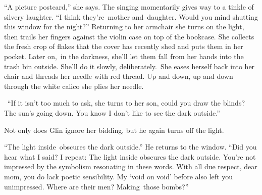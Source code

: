 \documentclass[letterpaper]{article}
\begin{document}
\textcolor[rgb]{0.13333334,0.13333334,0.13333334}{{}``A picture postcard,'' she says. The singing momentarily gives way
to a tinkle of silvery laughter. ``I think they're~mother and~daughter}. Would you mind shutting this window for the
night?\textcolor[rgb]{0.13333334,0.13333334,0.13333334}{{}'' }Returning\textcolor[rgb]{0.0,0.4392157,0.7529412}{
}\textcolor[rgb]{0.13333334,0.13333334,0.13333334}{to her armchair she turns on the light, }then trails her fingers
\textcolor[rgb]{0.13333334,0.13333334,0.13333334}{against the violin case on }top
of\textcolor[rgb]{0.0,0.4392157,0.7529412}{ }\textcolor[rgb]{0.13333334,0.13333334,0.13333334}{the bookcase. She
collects the fresh crop of flakes that the cover has recently shed and
}puts\textcolor[rgb]{0.13333334,0.13333334,0.13333334}{ them in her pocket. Later on},~in the darkness,
\textcolor[rgb]{0.13333334,0.13333334,0.13333334}{she'll let them fall from her hands into the trash bin
}outside\textcolor[rgb]{0.13333334,0.13333334,0.13333334}{. She'll do it slowly, deliberately.~She eases herself back
into her chair and threads her needle with red thread. Up and down, up and down }through the white calico she
\textcolor[rgb]{0.13333334,0.13333334,0.13333334}{plies her needle. \ }

\textcolor[rgb]{0.13333334,0.13333334,0.13333334}{\ {}``If it isn't}\textcolor[rgb]{0.0,0.4392157,0.7529412}{
}\textcolor[rgb]{0.13333334,0.13333334,0.13333334}{too much to ask,{\textquotedbl} she }turns to her son,
\textcolor[rgb]{0.13333334,0.13333334,0.13333334}{{\textquotedbl}could you }draw the blinds? The sun's going
down.\textcolor[rgb]{0.13333334,0.13333334,0.13333334}{ You know I don't like to see the dark}
\textcolor[rgb]{0.13333334,0.13333334,0.13333334}{outside.''}

\textcolor[rgb]{0.13333334,0.13333334,0.13333334}{Not only does Glin
}ignore\textcolor[rgb]{0.13333334,0.13333334,0.13333334}{ her bidding, but he again turns off the light. }

\textcolor[rgb]{0.13333334,0.13333334,0.13333334}{{}``The light inside~o}bscures
\textcolor[rgb]{0.13333334,0.13333334,0.13333334}{the dark outside.'' He returns to the window. ``Did you hear what I
said? I repeat}\textcolor[rgb]{0.0,0.4392157,0.7529412}{:}\textcolor[rgb]{0.13333334,0.13333334,0.13333334}{ The light
inside }obscures\textcolor[rgb]{0.13333334,0.13333334,0.13333334}{ the dark outside. You're not impressed by the
symbolism resonating in these words. With all due respect, }dear mom,
\textcolor[rgb]{0.13333334,0.13333334,0.13333334}{you do lack poetic sensibility. My `void on void' }before also left
you unimpressed.\textcolor[rgb]{0.13333334,0.13333334,0.13333334}{ Where are their men?
}Making\textcolor[rgb]{0.13333334,0.13333334,0.13333334}{~those bombs?''}
\end{document}
